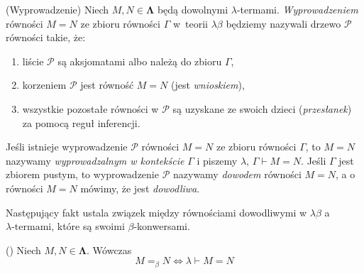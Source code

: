 \begin{definicja}(Wyprowadzenie)
Niech \(M, N\in\mathbf{\Lambda}\) będą dowolnymi \(\lambda\)-termami.
\emph{Wyprowadzeniem} równości \(M=N\) ze zbioru równości \(\Gamma\) w~teorii \(\lambda\beta\) będziemy nazywali drzewo \(\mathcal{P}\) równości takie, że:
\begin{enumerate}[label={(\roman*)}, ref={(\roman*)}]
  \setlength\itemsep{0em}
  \item liście \(\mathcal{P}\) są aksjomatami albo należą do zbioru \(\Gamma\),
  \item korzeniem \(\mathcal{P}\) jest równość \(M=N\) (jest \emph{wnioskiem}),
  \item wszystkie pozostałe równości w \(\mathcal{P}\) są uzyskane ze swoich dzieci (\emph{przesłanek}) za pomocą reguł inferencji.
\end{enumerate}

Jeśli istnieje wyprowadzenie \(\mathcal{P}\) równości \(M=N\) ze zbioru równości \(\Gamma\), to \(M=N\) nazywamy \emph{wyprowadzalnym w kontekście} \(\Gamma\) i piszemy \(\lambda,\,\Gamma\vdash M=N\). Jeśli \(\Gamma\) jest zbiorem pustym, to wyprowadzenie \(\mathcal{P}\) nazywamy \emph{dowodem} równości \(M=N\), a o równości \(M=N\) mówimy, że jest \emph{dowodliwa}.
\end{definicja}

Następujący fakt ustala związek między równościami dowodliwymi w \(\lambda\beta\) a \(\lambda\text{-termami}\), które są swoimi \(\beta\)-konwersami.
\begin{fakt}(\cite[Lem. 6.4]{Hindley:2008:LCI:1388400})
Niech \(M, N\in\mathbf{\Lambda}\). Wówczas
\[
M=_\beta N \iff \lambda \vdash M=N
\]
\end{fakt}
